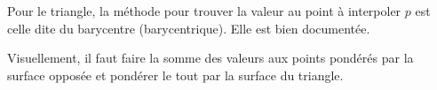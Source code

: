 Pour le triangle, la méthode pour trouver la valeur au point à interpoler \( p \) est celle dite du barycentre (barycentrique).
Elle est bien documentée.

Visuellement, il faut faire la somme des valeurs aux points pondérés par la surface opposée et pondérer le tout par la surface du triangle.

